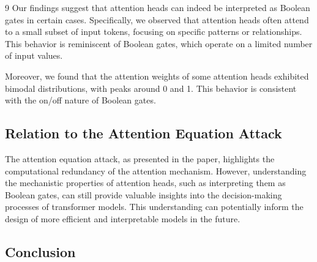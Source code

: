 \documentclass[11pt]{article}
\theoremstyle{definition}
\begin{document}
\begin{thebibliography}{9}
Our findings suggest that attention heads can indeed be interpreted as Boolean gates in certain cases. Specifically, we observed that attention heads often attend to a small subset of input tokens, focusing on specific patterns or relationships. This behavior is reminiscent of Boolean gates, which operate on a limited number of input values.













Moreover, we found that the attention weights of some attention heads exhibited bimodal distributions, with peaks around 0 and 1. This behavior is consistent with the on/off nature of Boolean gates.













\subsection{Relation to the Attention Equation Attack}













The attention equation attack, as presented in the paper, highlights the computational redundancy of the attention mechanism. However, understanding the mechanistic properties of attention heads, such as interpreting them as Boolean gates, can still provide valuable insights into the decision-making processes of transformer models. This understanding can potentially inform the design of more efficient and interpretable models in the future.













\subsection{Conclusion}














\end{thebibliography}
\end{document}
